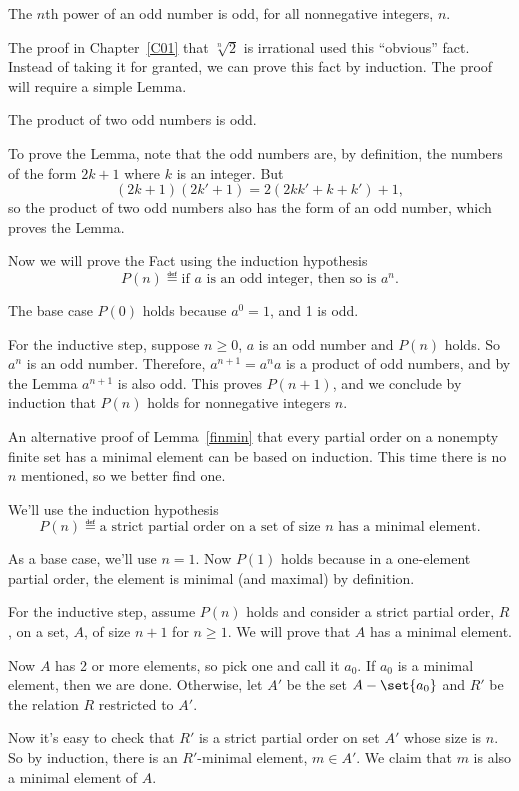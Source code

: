 \begin{fact*}
The $n$th power of an odd number is odd, for all nonnegative integers, $n$.
\end{fact*}
The proof in Chapter~\ref{C01} that $\sqrt[n]{2}$ is irrational used this 
``obvious'' fact.  Instead of taking it for granted, we can prove this fact
by induction.
The proof will require a simple Lemma.
\begin{lemma*}
The product of two odd numbers is odd.
\end{lemma*}
To prove the Lemma, note that the odd numbers are, by definition, the
numbers of the form $2k+1$ where $k$ is an integer.  But
\[
(2k+1)(2k'+1) = 2(2kk' + k + k')+1,
\]
so the product of two odd numbers also has the form of an odd number,
which proves the Lemma.

Now we will prove the Fact using the induction hypothesis
\[
P(n) \eqdef \text{if $a$ is an odd integer, then so is $a^{n}$}.
\]

The base case $P(0)$ holds because $a^{0} =1$, and 1 is odd.

For the inductive step, suppose $n\geq 0$, $a$ is an odd number and $P(n)$
holds.  So $a^n$ is an odd number.  Therefore, $a^{n+1} = a^{n}a$ is a
product of odd numbers, and by the Lemma $a^{n+1}$ is also odd.  This
proves $P(n+1)$, and we conclude by induction that $P(n)$ holds for
nonnegative integers $n$.
\fi

\iffalse
An alternative proof of Lemma~\ref{finmin} that every partial order on a
nonempty finite set has a minimal element can be based on induction.  This
time there is no $n$ mentioned, so we better find one.

We'll use the induction hypothesis
\[
P(n) \eqdef \text{a strict partial order on a set of size $n$ has a minimal
  element}.
\]

As a base case, we'll use $n=1$.  Now $P(1)$ holds because in a
one-element partial order, the element is minimal (and maximal) by
definition.

For the inductive step, assume $P(n)$ holds and consider a strict partial
order, $R$, on a set, $A$, of size $n+1$ for $n \geq 1$.  We will prove
that $A$ has a minimal element.

Now $A$ has 2 or more elements, so pick one and call it $a_0$.  If $a_0$
is a minimal element, then we are done.  Otherwise, let $A'$ be the set $A
- \set{a_0}$ and $R'$ be the relation $R$ restricted to $A'$.

Now it's easy to check that $R'$ is a strict partial order on set $A'$
whose size is $n$.  So by induction, there is an $R'$-minimal element, $m
\in A'$.  We claim that $m$ is also a minimal element of $A$.

